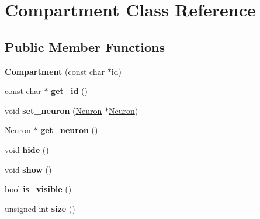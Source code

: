 \hypertarget{classCompartment}{\section{Compartment Class Reference}
\label{classCompartment}
}
\subsection*{Public Member Functions}
\begin{DoxyCompactItemize}
\item 
\hypertarget{classCompartment_a38a29a2e29ed0cd4331a7b4fa30d76ac}{{\bfseries Compartment} (const char $\ast$id)}\label{classCompartment_a38a29a2e29ed0cd4331a7b4fa30d76ac}

\item 
\hypertarget{classCompartment_a765ab8ee0882726b757880452614a252}{const char $\ast$ {\bfseries get\-\_\-id} ()}\label{classCompartment_a765ab8ee0882726b757880452614a252}

\item 
\hypertarget{classCompartment_a8f091f514a8228cd788e161d95b30e82}{void {\bfseries set\-\_\-neuron} (\hyperlink{classNeuron}{Neuron} $\ast$\hyperlink{classNeuron}{Neuron})}\label{classCompartment_a8f091f514a8228cd788e161d95b30e82}

\item 
\hypertarget{classCompartment_a7bf21873fe750c61ea9147fe09822182}{\hyperlink{classNeuron}{Neuron} $\ast$ {\bfseries get\-\_\-neuron} ()}\label{classCompartment_a7bf21873fe750c61ea9147fe09822182}

\item 
\hypertarget{classCompartment_ad1cb24afb9b7434089928d2385a4206f}{void {\bfseries hide} ()}\label{classCompartment_ad1cb24afb9b7434089928d2385a4206f}

\item 
\hypertarget{classCompartment_aa67f77ce7177b97d0ee197c4190927c1}{void {\bfseries show} ()}\label{classCompartment_aa67f77ce7177b97d0ee197c4190927c1}

\item 
\hypertarget{classCompartment_ab4bd90fdd259fad72c19eaba06d64c0c}{bool {\bfseries is\-\_\-visible} ()}\label{classCompartment_ab4bd90fdd259fad72c19eaba06d64c0c}

\item 
\hypertarget{classCompartment_af63a6d167ec4e743c5d6bbadd167ec88}{unsigned int {\bfseries size} ()}\label{classCompartment_af63a6d167ec4e743c5d6bbadd167ec88}


\end{DoxyCompactItemize}
